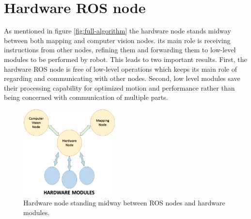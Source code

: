 \documentclass[12pt]{book}
\begin{document}
\section{Hardware ROS node}
As mentioned in figure \ref{fig:full-algorithm} the hardware node stands midway between both mapping and computer vision nodes. its main role is receiving instructions from other nodes, refining them and forwarding them to low-level modules to be performed by robot. This leads to two important results. First, the hardware ROS node is free of low-level operations which keeps its main role of regarding and communicating with other nodes. Second, low level modules save their processing capability for optimized motion and performance rather than being concerned with communication of multiple parts. 
\begin{figure}
	\centering
	\includegraphics[width =0.45\textwidth]{Fig/hw-node.png}
	\caption{Hardware node standing midway between ROS nodes and hardware modules.}
	\label{fig:hw-node}
\end{figure}

\newpage
\end{document}

